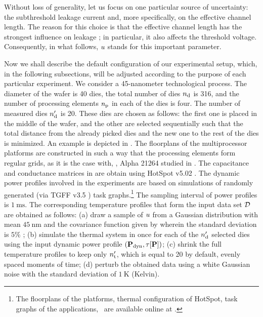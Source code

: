 Without loss of generality, let us focus on one particular source of uncertainty: the subthreshold leakage current and, more specifically, on the effective channel length.
The reason for this choice is that the effective channel length has the strongest influence on leakage \cite{chandrakasan2001, srivastava2010, juan2011, juan2012}; in particular, it also affects the threshold voltage. Consequently, in what follows, $u$ stands for this important parameter.



Now we shall describe the default configuration of our experimental setup, which, in the following subsections, will be adjusted according to the purpose of each particular experiment.
We consider a 45-nanometer technological process. The diameter of the wafer is 40 dies, the total number of dies ${n_\text{d}}$ is 316, and the number of processing elements ${n_\text{p}}$ in each of the dies is four.
The number of measured dies ${n_\text{d}'}$ is 20. These dies are chosen as follows: the first one is placed in the middle of the wafer, and the other are selected sequentially such that the total distance from the already picked dies and the new one to the rest of the dies is minimized. An example is depicted in .
The floorplans of the multiprocessor platforms are constructed in such a way that the processing elements form regular grids, as it is the case with, \eg, Alpha 21264 studied in \cite{juan2011}. The capacitance and conductance matrices in  are obtain using HotSpot v5.02 \cite{hotspot}.
The dynamic power profiles involved in the experiments are based on simulations of randomly generated (via TGFF v3.5 \cite{dick1998}) task graphs.\footnote{The floorplans of the platforms, thermal configuration of HotSpot, task graphs of the applications, \etc\ are available online at \cite{sources}.} The sampling interval of power profiles is $1~\text{ms}$.
The corresponding temperature profiles that form the input data set $\mathcal{D}$ are obtained as follows: (a) draw a sample of $u$ from a Gaussian distribution with mean $45~\text{nm}$ and the covariance function given by  wherein the standard deviation is $5\%$ \cite{juan2011, juan2012}; (b) simulate the thermal system in  once for each of the ${n_\text{d}'}$ selected dies using the input dynamic power profile $(\mathbf{P}_{\text{dyn}}, \tau[\mathbf{P}])$; (c) shrink the full temperature profiles to keep only ${n_\text{t}'}$, which is equal to 20 by default, evenly spaced moments of time; (d) perturb the obtained data using a white Gaussian noise with the standard deviation of $1~\text{K}$ (Kelvin).

